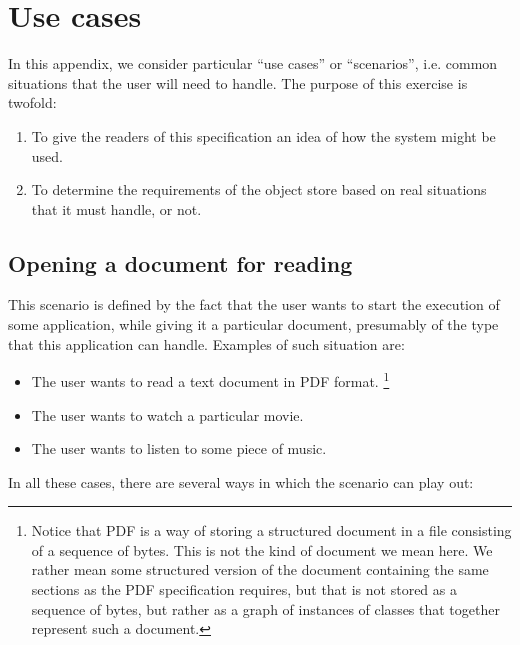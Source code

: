 \chapter{Use cases}

In this appendix, we consider particular ``use cases'' or
``scenarios'', i.e. common situations that the user will need to
handle.  The purpose of this exercise is twofold:

\begin{enumerate}
\item To give the readers of this specification an idea of how the
  system might be used.
\item To determine the requirements of the object store
   based on real situations that it must
  handle, or not.
\end{enumerate}

\section{Opening a document for reading}

This scenario is defined by the fact that the user wants to start the
execution of some application, while giving it a particular document,
presumably of the type that this application can handle.  Examples of
such situation are:

\begin{itemize}
\item The user wants to read a text document in PDF format.%
  \footnote{Notice that PDF is a way of storing a structured document
    in a file consisting of a sequence of bytes.  This is not the kind
    of document we mean here.  We rather mean some structured version
    of the document containing the same sections as the PDF
    specification requires, but that is not stored as a sequence of
    bytes, but rather as a graph of instances of classes that together
    represent such a document.}
\item The user wants to watch a particular movie.
\item The user wants to listen to some piece of music.
\end{itemize}

In all these cases, there are several ways in which the scenario can
play out:

